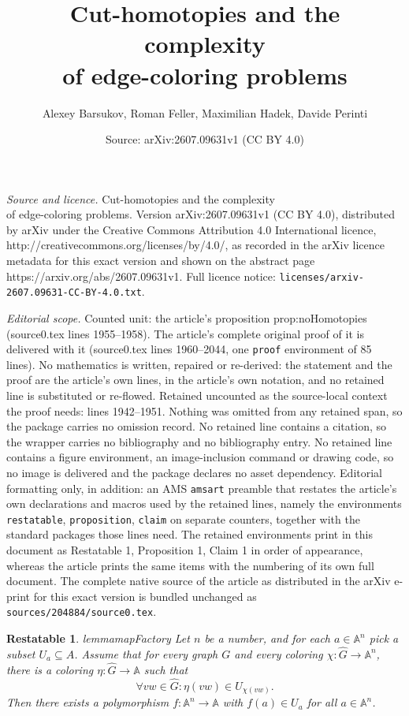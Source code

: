 \documentclass[10pt,a4paper]{amsart}
\title{Cut-homotopies and the complexity\\ of edge-coloring problems}
\author{Alexey Barsukov, Roman Feller, Maximilian Hadek, Davide Perinti}
\date{Source: arXiv:2607.09631v1 (CC BY 4.0)}
\newtheorem{restatable}{Restatable}
\newcommand{\str}[1]{\mathbb{#1}}
\begin{document}
\maketitle

\noindent\emph{Source and licence.} Cut-homotopies and the complexity\\ of edge-coloring problems. Version arXiv:2607.09631v1 (CC BY 4.0), distributed by arXiv under the Creative Commons Attribution 4.0 International licence, http://creativecommons.org/licenses/by/4.0/, as recorded in the arXiv licence metadata for this exact version and shown on the abstract page https://arxiv.org/abs/2607.09631v1. Full licence notice: \texttt{licenses/arxiv-2607.09631-CC-BY-4.0.txt}.\par\smallskip

\noindent\textit{Editorial scope.} Counted unit: the article's proposition prop:noHomotopies (source0.tex lines 1955--1958). The article's complete original proof of it is delivered with it (source0.tex lines 1960--2044, one \texttt{proof} environment of 85 lines). No mathematics is written, repaired or re-derived: the statement and the proof are the article's own lines, in the article's own notation, and no retained line is substituted or re-flowed.  Retained uncounted as the source-local context the proof needs: lines 1942--1951.  Nothing was omitted from any retained span, so the package carries no omission record.  No retained line contains a citation, so the wrapper carries no bibliography and no bibliography entry.  No retained line contains a figure environment, an image-inclusion command or drawing code, so no image is delivered and the package declares no asset dependency.  Editorial formatting only, in addition: an AMS \texttt{amsart} preamble that restates the article's own declarations and macros used by the retained lines, namely the environments \texttt{restatable}, \texttt{proposition}, \texttt{claim} on separate counters, together with the standard packages those lines need.  The retained environments print in this document as Restatable 1, Proposition 1, Claim 1 in order of appearance, whereas the article prints the same items with the numbering of its own full document.  The complete native source of the article as distributed in the arXiv e-print for this exact version is bundled unchanged as \texttt{sources/204884/source0.tex}.
\begin{restatable}{lemma}{mapFactory}
\label{lem:mapFactory}
    Let $n$ be a number, and for each $a\in \str A^n$ pick a subset $U_{a}\subseteq A$. Assume that for every graph $G$ and every coloring $\chi\colon \hat G\to \str A^n$, there is a coloring $\eta\colon \hat G\to \str A$ such that 
    \begin{equation*}
        \forall vw\in\hat G: \eta(vw)\in U_{\chi(vw)}.
    \end{equation*}
    Then there exists a polymorphism 
    $f \colon \str A^n \to \str A$ 
    with $f(a)\in U_{a}$ for all $a \in \str A^n$.
\end{restatable}
\end{document}
